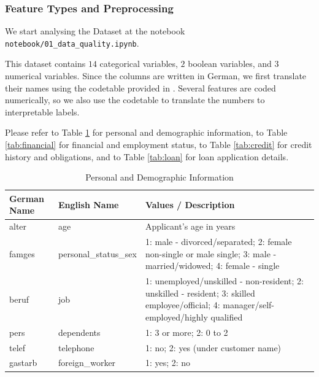 \subsubsection{Feature Types and Preprocessing}

We start analysing the Dataset at the notebook \texttt{notebook/01\_data\_quality.ipynb}.

This dataset contains $14$ categorical variables, $2$ boolean variables, and $3$ numerical variables. Since the columns are written in German, we first translate their names using the codetable provided in \cite{south_2019}. Several features are coded numerically, so we also use the codetable to translate the numbers to interpretable labels.

Please refer to Table \ref{tab:personal} for personal and demographic information, to Table \ref{tab:financial} for financial and employment status, to Table \ref{tab:credit} for credit history and obligations, and to Table \ref{tab:loan} for loan application details.

\begin{table}[t]
\small
\caption{Personal and Demographic Information}
\begin{tabularx}{\textwidth}{>{\ttfamily}l l X}
\toprule
\label{tab:personal}
\textbf{German Name} & \textbf{English Name} & \textbf{Values / Description} \\
\midrule
alter   & age                     & Applicant's age in years \\
famges  & personal\_status\_sex   & 1: male - divorced/separated; 2: female non-single or male single; 3: male - married/widowed; 4: female - single \\
beruf   & job                     & 1: unemployed/unskilled - non-resident; 2: unskilled - resident; 3: skilled employee/official; 4: manager/self-employed/highly qualified \\
pers    & dependents          & 1: 3 or more; 2: 0 to 2 \\
telef   & telephone               & 1: no; 2: yes (under customer name) \\
gastarb & foreign\_worker         & 1: yes; 2: no \\
\bottomrule
\end{tabularx}
\end{table}

